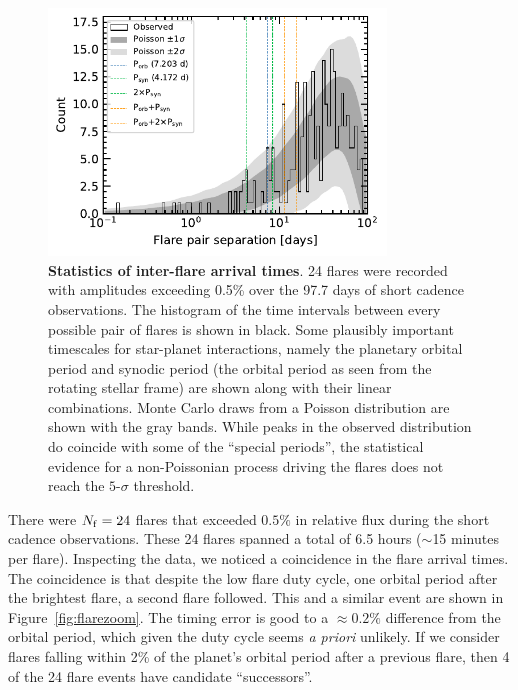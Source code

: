 \documentclass[12pt,modern,twocolumn,tighten]{aastex63}
\begin{document}
\begin{figure}[tp]
	\begin{center}
		\leavevmode
		\includegraphics[width=0.8\textwidth]{f13.pdf}
	\end{center}
	\vspace{-0.7cm}
	\caption{
		{\bf Statistics of inter-flare arrival times}.  
    24 flares were recorded with amplitudes exceeding 0.5\% over the
    97.7 days of short cadence observations.  The histogram of the
    time intervals between every possible pair of flares is shown in
    black.  Some plausibly important timescales for star-planet
    interactions, namely the planetary orbital period and synodic
    period (the orbital period as seen from the rotating stellar
    frame) are shown along with their linear combinations.  Monte
    Carlo draws from a Poisson distribution are shown with the gray
    bands.  While peaks in the observed distribution do coincide with
    some of the ``special periods'', the statistical evidence for a
    non-Poissonian process driving the flares does not reach the
    $5$-$\sigma$ threshold.
		\label{fig:flarestats}
	}
\end{figure}


There were $N_{\rm f}=24$ flares that exceeded $0.5\%$ in relative
flux during the short cadence observations.  These 24 flares spanned a
total of 6.5 hours ($\sim$15 minutes per flare).  Inspecting the data,
we noticed a coincidence in the flare arrival times.  The coincidence
is that despite the low flare duty cycle, one orbital period after the
brightest flare, a second flare followed.  This and a similar event
are shown in Figure~\ref{fig:flarezoom}.  The timing error is good to
a $\approx0.2\%$ difference from the orbital period, which given the
duty cycle seems {\it a priori} unlikely.  If we consider flares
falling within 2\% of the planet's orbital period after a previous
flare, then 4 of the 24 flare events have candidate ``successors''.
\end{document}
